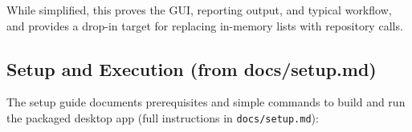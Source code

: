 \documentclass[12pt,a4paper]{article}
\newcommand{\file}[1]{\texttt{#1}}
\begin{document}
\begin{comment}
\begin{lstlisting}[style=java, caption=Borrow and return flows in the Swing prototype]
private void borrowBook() {
  Student student = (Student) studentCombo.getSelectedItem();
  Book book = (Book) bookCombo.getSelectedItem();
  if (book.availableCopies > 0) {
    book.availableCopies--;
    loans.add(new Loan(loans.size() + 1, student.id, book.id,
                       student.name, book.title, "Active"));
    statusArea.setText("Book '" + book.title + "' borrowed by " + student.name);
  } else {
    statusArea.setText("Error: No copies of '" + book.title + "' available");
  }
}

private void returnBook() {
  Student student = (Student) studentCombo.getSelectedItem();
  Book book = (Book) bookCombo.getSelectedItem();
  for (Loan loan : loans) {
    if (loan.studentId == student.id && loan.bookId == book.id &&
        loan.status.equals("Active")) {
      loan.status = "Returned";
      book.availableCopies++;
      fines.add(new Fine(fines.size() + 1, student.id, student.name, 5.0, "Unpaid"));
      statusArea.setText("Book '" + book.title + "' returned by " + student.name +
                         ". Fine of $5.00 added for late return.");
      return;
    }
  }
  statusArea.setText("Error: No active loan found for this student and book");
}
\end{lstlisting}
\end{comment}

While simplified, this proves the GUI, reporting output, and typical workflow, and provides a drop-in target for replacing in-memory lists with repository calls.

\subsection{Setup and Execution (from docs/setup.md)}

The setup guide documents prerequisites and simple commands to build and run the packaged desktop app (full instructions in \file{docs/setup.md}):

\begin{comment}
\begin{lstlisting}[style=java, caption=Build and run commands]
mvn clean package
java -jar target/library-database-system-1.0.0.jar

# or run with classpath & dependencies
mvn dependency:copy-dependencies -DoutputDirectory=lib
java -cp "target/classes;lib/*" com.library.LibraryApp
\end{lstlisting}
\end{comment}
\end{document}

